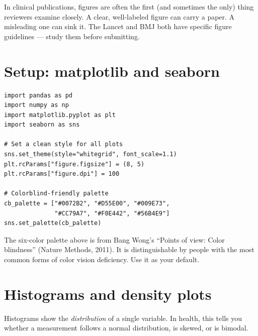 \begin{clinicalnote}
In clinical publications, figures are often the first (and sometimes the only) thing reviewers examine closely. A clear, well-labeled figure can carry a paper. A misleading one can sink it. The Lancet and BMJ both have specific figure guidelines --- study them before submitting.
\end{clinicalnote}

\section{Setup: matplotlib and seaborn}

\begin{verbatim}
import pandas as pd
import numpy as np
import matplotlib.pyplot as plt
import seaborn as sns

# Set a clean style for all plots
sns.set_theme(style="whitegrid", font_scale=1.1)
plt.rcParams["figure.figsize"] = (8, 5)
plt.rcParams["figure.dpi"] = 100

# Colorblind-friendly palette
cb_palette = ["#0072B2", "#D55E00", "#009E73",
              "#CC79A7", "#F0E442", "#56B4E9"]
sns.set_palette(cb_palette)
\end{verbatim}

\begin{pythontip}
The six-color palette above is from Bang Wong's ``Points of view: Color blindness'' (Nature Methods, 2011). It is distinguishable by people with the most common forms of color vision deficiency. Use it as your default.
\end{pythontip}

\section{Histograms and density plots}

Histograms show the \emph{distribution} of a single variable. In health, this tells you whether a measurement follows a normal distribution, is skewed, or is bimodal.

